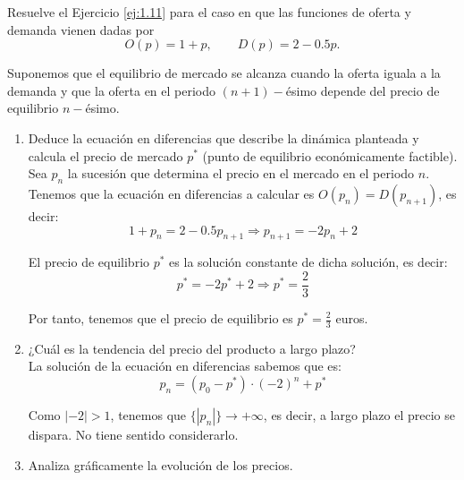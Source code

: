 \begin{ejercicio} \label{ej:1.12}
    Resuelve el Ejercicio \ref{ej:1.11} para el caso en que las funciones de oferta y demanda vienen dadas por
    \begin{equation*}
        O(p)=1+p,\qquad D(p)=2-0.5p.
    \end{equation*}

    Suponemos que el equilibrio de mercado se alcanza cuando la oferta iguala a la demanda y que la oferta en el periodo $(n + 1)-$ésimo depende del precio de equilibrio $n-$ésimo.
    \begin{enumerate}
        \item Deduce la ecuación en diferencias que describe la dinámica planteada y calcula el precio de mercado $p^\ast$ (punto de equilibrio económicamente factible).\\

        Sea $p_n$ la sucesión que determina el precio en el mercado en el periodo $n$. Tenemos que la ecuación en diferencias a calcular es $O(p_{n})=D(p_{n+1})$, es decir:
        \begin{equation*}
            1+p_n = 2-0.5p_{n+1} \Longrightarrow p_{n+1} = -2p_n +2
        \end{equation*}

        El precio de equilibrio $p^\ast$ es la solución constante de dicha solución, es decir:
        \begin{equation*}
            p^\ast = -2p^\ast +2 \Longrightarrow p^\ast = \frac{2}{3}
        \end{equation*}

        Por tanto, tenemos que el precio de equilibrio es $p^\ast = \frac{2}{3}$ euros.
        
        \item ¿Cuál es la tendencia del precio del producto a largo plazo?\\

        La solución de la ecuación en diferencias sabemos que es:
        \begin{equation*}
            p_{n} = (p_0-p^\ast)\cdot \left(-2\right)^n + p^\ast
        \end{equation*}

        Como $\left|-2\right|>1$, tenemos que $\{|p_n|\}\to +\infty$, es decir, a largo plazo el precio se dispara. No tiene sentido considerarlo.
        
        \item Analiza gráficamente la evolución de los precios.


\end{enumerate}
\end{ejercicio}
